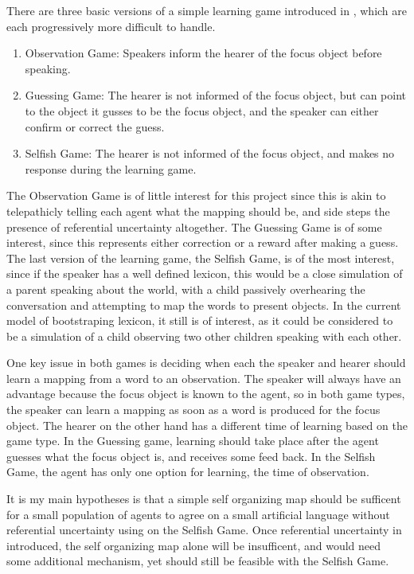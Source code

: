 \documentclass[a4paper,11pt]{article}
\begin{document}
There are three basic versions of a simple learning game introduced in
\cite{VogtLearningSim}, which are each progressively more difficult to handle.

\begin{enumerate}

\item Observation Game: Speakers inform the hearer of the focus object before
speaking.

\item Guessing Game: The hearer is not informed of the focus object, but can
point to the object it gusses to be the focus object, and the speaker can either
confirm or correct the guess.

\item Selfish Game: The hearer is not informed of the focus object, and makes no
response during the learning game.

\end{enumerate}

The Observation Game is of little interest for this project since this is akin
to telepathicly telling each agent what the mapping should be, and side steps
the presence of referential uncertainty altogether.  The Guessing Game is of
some interest, since this represents either correction or a reward after making
a guess.  The last version of the learning game, the Selfish Game, is of the
most interest, since if the speaker has a well defined lexicon, this would be a
close simulation of a parent speaking about the world, with a child passively
overhearing the conversation and attempting to map the words to present objects.
In the current model of bootstraping lexicon, it still is of interest, as it
could be considered to be a simulation of a child observing two other children
speaking with each other.

One key issue in both games is deciding when each the speaker and hearer should
learn a mapping from a word to an observation.  The speaker will always have an
advantage because the focus object is known to the agent, so in both game types,
the speaker can learn a mapping as soon as a word is produced for the focus
object.  The hearer on the other hand has a different time of learning based on
the game type.  In the Guessing game, learning should take place after the agent
guesses what the focus object is, and receives some feed back.  In the Selfish
Game, the agent has only one option for learning, the time of observation.

It is my main hypotheses is that a simple self organizing map should be
sufficent for a small population of agents to agree on a small artificial
language without referential uncertainty using on the Selfish Game.  Once
referential uncertainty in introduced, the self organizing map alone will be
insufficent, and would need some additional mechanism, yet should still be
feasible with the Selfish Game.
\end{document}
